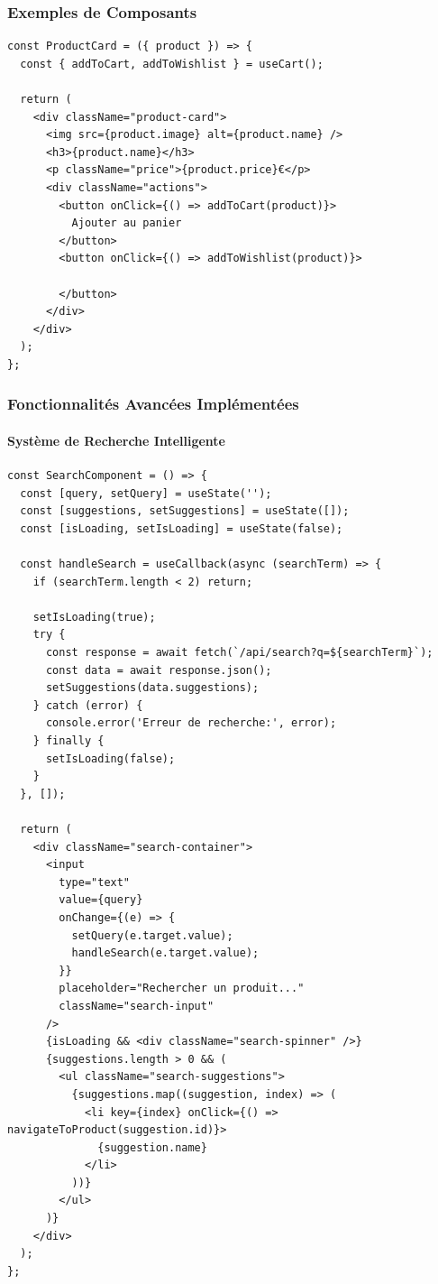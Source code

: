 \documentclass[12pt,a4paper]{article}
\begin{document}
\subsubsection{Exemples de Composants}
\begin{lstlisting}[caption=Composant ProductCard]
const ProductCard = ({ product }) => {
  const { addToCart, addToWishlist } = useCart();
  
  return (
    <div className="product-card">
      <img src={product.image} alt={product.name} />
      <h3>{product.name}</h3>
      <p className="price">{product.price}€</p>
      <div className="actions">
        <button onClick={() => addToCart(product)}>
          Ajouter au panier
        </button>
        <button onClick={() => addToWishlist(product)}>
          
        </button>
      </div>
    </div>
  );
};
\end{lstlisting}

\subsubsection{Fonctionnalités Avancées Implémentées}

\paragraph{Système de Recherche Intelligente}
\begin{lstlisting}[caption=Composant de recherche avec suggestions]
const SearchComponent = () => {
  const [query, setQuery] = useState('');
  const [suggestions, setSuggestions] = useState([]);
  const [isLoading, setIsLoading] = useState(false);

  const handleSearch = useCallback(async (searchTerm) => {
    if (searchTerm.length < 2) return;
    
    setIsLoading(true);
    try {
      const response = await fetch(`/api/search?q=${searchTerm}`);
      const data = await response.json();
      setSuggestions(data.suggestions);
    } catch (error) {
      console.error('Erreur de recherche:', error);
    } finally {
      setIsLoading(false);
    }
  }, []);

  return (
    <div className="search-container">
      <input
        type="text"
        value={query}
        onChange={(e) => {
          setQuery(e.target.value);
          handleSearch(e.target.value);
        }}
        placeholder="Rechercher un produit..."
        className="search-input"
      />
      {isLoading && <div className="search-spinner" />}
      {suggestions.length > 0 && (
        <ul className="search-suggestions">
          {suggestions.map((suggestion, index) => (
            <li key={index} onClick={() => navigateToProduct(suggestion.id)}>
              {suggestion.name}
            </li>
          ))}
        </ul>
      )}
    </div>
  );
};
\end{lstlisting}
\end{document}
